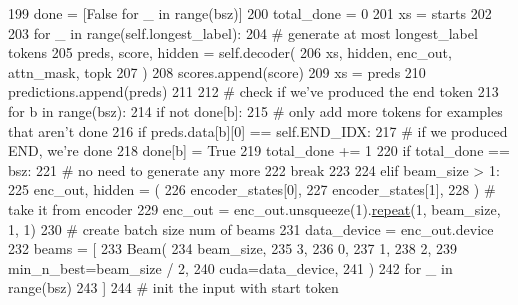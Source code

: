 \begin{DoxyCode}
199                 done = [\textcolor{keyword}{False} \textcolor{keywordflow}{for} \_ \textcolor{keywordflow}{in} range(bsz)]
200                 total\_done = 0
201                 xs = starts
202 
203                 \textcolor{keywordflow}{for} \_ \textcolor{keywordflow}{in} range(self.longest\_label):
204                     \textcolor{comment}{# generate at most longest\_label tokens}
205                     preds, score, hidden = self.decoder(
206                         xs, hidden, enc\_out, attn\_mask, topk
207                     )
208                     scores.append(score)
209                     xs = preds
210                     predictions.append(preds)
211 
212                     \textcolor{comment}{# check if we've produced the end token}
213                     \textcolor{keywordflow}{for} b \textcolor{keywordflow}{in} range(bsz):
214                         \textcolor{keywordflow}{if} \textcolor{keywordflow}{not} done[b]:
215                             \textcolor{comment}{# only add more tokens for examples that aren't done}
216                             \textcolor{keywordflow}{if} preds.data[b][0] == self.END\_IDX:
217                                 \textcolor{comment}{# if we produced END, we're done}
218                                 done[b] = \textcolor{keyword}{True}
219                                 total\_done += 1
220                     \textcolor{keywordflow}{if} total\_done == bsz:
221                         \textcolor{comment}{# no need to generate any more}
222                         \textcolor{keywordflow}{break}
223 
224             \textcolor{keywordflow}{elif} beam\_size > 1:
225                 enc\_out, hidden = (
226                     encoder\_states[0],
227                     encoder\_states[1],
228                 )  \textcolor{comment}{# take it from encoder}
229                 enc\_out = enc\_out.unsqueeze(1).\hyperlink{namespacerepeat}{repeat}(1, beam\_size, 1, 1)
230                 \textcolor{comment}{# create batch size num of beams}
231                 data\_device = enc\_out.device
232                 beams = [
233                     Beam(
234                         beam\_size,
235                         3,
236                         0,
237                         1,
238                         2,
239                         min\_n\_best=beam\_size / 2,
240                         cuda=data\_device,
241                     )
242                     \textcolor{keywordflow}{for} \_ \textcolor{keywordflow}{in} range(bsz)
243                 ]
244                 \textcolor{comment}{# init the input with start token}

\end{DoxyCode}

